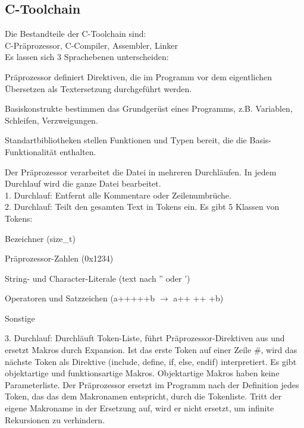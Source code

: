 \documentclass[8pt,landscape,a4paper]{scrartcl}
\newcommand{\drule}[3][0]{%
	\tikz[baseline]{\path[decoration={markings,
			mark=between positions 0 and 1 step 2*#3
			with {\node[fill, circle, minimum width=#3, inner sep=0pt, anchor=south west] {};}},postaction={decorate}]  (0,#1) -- ++(#2,0);}}
\begin{document}
\begin{multicols*}{5}
\section{C-Toolchain}
Die \textcolor{b}{Bestandteile} der C-Toolchain sind:\\
C-Präprozessor, C-Compiler, Assembler, Linker\\
Es lassen sich 3 Sprachebenen unterscheiden: 
\begin{compactitem} [$\bullet$]
	\item \textcolor{b}{Präprozessor} definiert Direktiven, die im Programm vor dem eigentlichen
	Übersetzen als Textersetzung durchgeführt werden.
	\item \textcolor{b}{Basiskonstrukte} bestimmen das Grundgerüst eines Programms, z.B. Variablen,
	Schleifen, Verzweigungen.
	\item \textcolor{b}{Standartbibliotheken} stellen Funktionen und Typen bereit, die die Basis-Funktionalität enthalten.
\end{compactitem}
\vspace{-4pt}
\drule{5.5cm}{1pt}
Der \textcolor{b}{Präprozessor} verarbeitet die Datei in mehreren Durchläufen. In jedem Durchlauf wird die ganze Datei bearbeitet.\\
\textcolor{b}{1. Durchlauf:} Entfernt alle Kommentare oder Zeilenumbrüche.\\
\textcolor{b}{2. Durchlauf:} Teilt den gesamten Text in Tokens ein. Es gibt 5 Klassen von Tokens:
\begin{compactenum}
	\item Bezeichner (size\_t)
	\item Präprozessor-Zahlen (0x1234)
	\item String- und Character-Literale (text nach '' oder ')
	\item Operatoren und Satzzeichen (a+++++b $\rightarrow$ a++ ++ +b)
	\item Sonstige
\end{compactenum}
\textcolor{b}{3. Durchlauf:} Durchläuft Token-Liste, führt Präprozessor-Direktiven aus und ersetzt Makros durch Expansion. Ist das erste Token auf einer Zeile \#, wird das nächste Token als Direktive (include, define, if, else, endif) interpretiert.
\drule{5.5cm}{1pt}
Es gibt \textcolor{b}{objektartige} und \textcolor{b}{funktionsartige} Makros. Objektartige Makros haben keine Parameterliste. Der Präprozessor ersetzt im Programm nach der Definition jedes Token, das das dem Makronamen entspricht, durch die Tokenliste.
\textcolor{b}{Tritt} der \textcolor{b}{eigene Makroname in} der \textcolor{b}{Ersetzung} auf, wird er \textcolor{b}{nicht ersetzt}, um infinite Rekursionen zu verhindern.





\end{multicols*}
\end{document}

